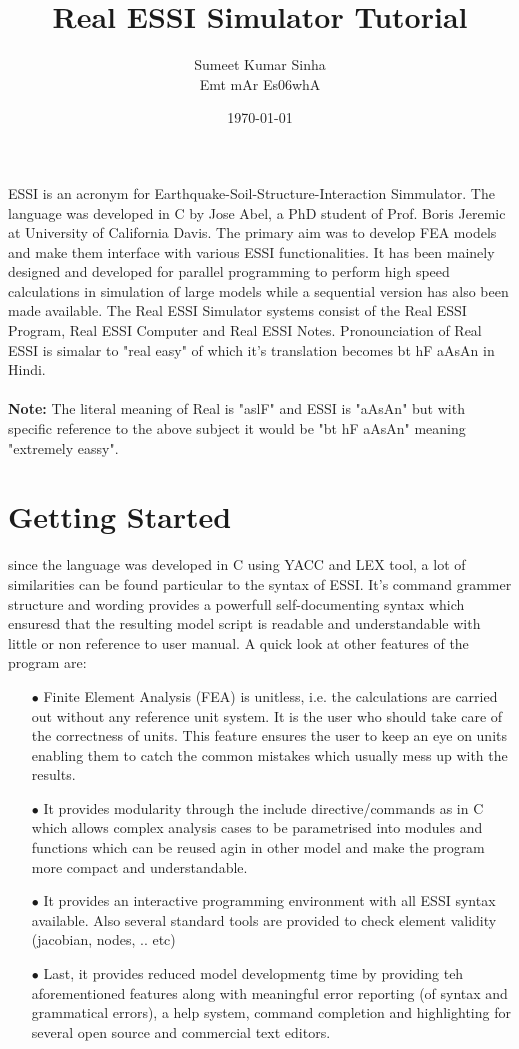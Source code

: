 \documentclass{article}
\title{Real ESSI Simulator Tutorial}
\author{Sumeet Kumar Sinha \\ {\dn \7{s}Emt \7{k}mAr Es\306whA }  }
\date{\today}
\begin{document}
\maketitle
ESSI is an acronym for Earthquake-Soil-Structure-Interaction Simmulator. The language was developed in C by Jose Abel, a PhD student of Prof. Boris Jeremic at University of California Davis. The primary aim was to develop FEA models and make them interface with various ESSI functionalities. It has been mainely designed and developed for parallel programming to perform high speed calculations in simulation of large models while a sequential version has also been made available. The Real ESSI Simulator systems consist of the Real ESSI Program, Real ESSI Computer and Real ESSI Notes. Pronounciation of Real ESSI is simalar to "real easy" of which it's translation becomes {\dn bt hF aAsAn} in Hindi. 
\\
\\
\textbf{Note:} The literal meaning of Real is "{\dn aslF}" and ESSI is "{\dn aAsAn}" but with specific reference to the above subject it would be "{\dn bt hF aAsAn}" meaning "extremely eassy".

\section {Getting Started} 
since the language was developed in C using YACC and LEX tool, a lot of similarities can be found particular to the syntax of ESSI. It's command grammer structure and wording provides a powerfull self-documenting syntax which ensuresd that the resulting model script is readable and understandable with little or non reference to user manual. A quick look at other features of the program are:

\begin{itemize}
  \item[$\bullet$] Finite Element Analysis (FEA) is unitless, i.e. the calculations are carried out without any reference unit system. It is the user who should take care of the correctness of units. This feature ensures the user to keep an eye on units enabling them to catch the common mistakes which usually mess up with the results.  
  \item[$\bullet$] It provides modularity through the include directive/commands as in C which allows complex analysis cases to be parametrised into modules and functions which can be reused agin in other model and make the program more compact and understandable.
  \item[$\bullet$] It provides an interactive programming environment with all ESSI syntax available. Also several standard tools are provided to check element validity (jacobian, nodes, .. etc)
  \item[$\bullet$] Last, it provides reduced model developmentg time by providing teh aforementioned features along with meaningful error reporting (of syntax and grammatical errors), a help system, command completion and highlighting for several open source and commercial text editors.
\end {itemize}
\end{document}

